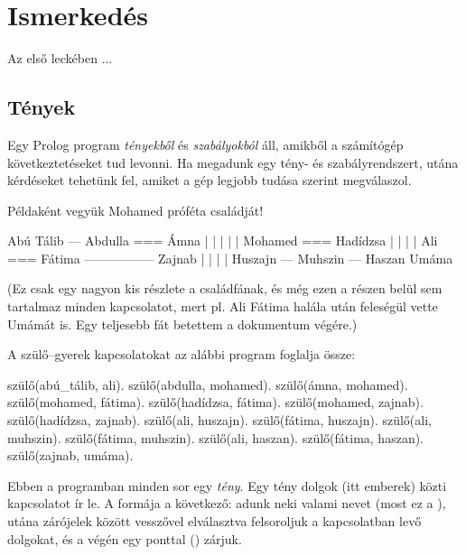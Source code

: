 
\chapter{Ismerkedés}

Az első leckében ...

\section{Tények}

Egy Prolog program \emph{tényekből} és
\emph{szabályokból} áll, amikből a számítógép
következtetéseket tud levonni. Ha megadunk egy
tény- és szabályrendszert, utána kérdéseket
tehetünk fel, amiket a gép legjobb tudása szerint
megválaszol.

Példaként vegyük Mohamed próféta családját!
\begin{prolog}
 Abú Tálib --- Abdulla === Ámna
     |                  |
     |                  |
     |               Mohamed === Hadídzsa
     |                        |
     |                        |
    Ali === Fátima ----------------- Zajnab
         |                             |
         |                             |
Huszajn --- Muhszin --- Haszan       Umáma
\end{prolog}
(Ez csak egy nagyon kis részlete a családfának, és
még ezen a részen belül sem tartalmaz minden
kapcsolatot, mert pl. Ali Fátima halála után
feleségül vette Umámát is. Egy teljesebb fát
betettem a dokumentum végére.)

A szülő--gyerek kapcsolatokat az alábbi program
foglalja össze:

\begin{prolog}
szülő(abú_tálib, ali).
szülő(abdulla, mohamed).
szülő(ámna, mohamed).
szülő(mohamed, fátima).
szülő(hadídzsa, fátima).
szülő(mohamed, zajnab).
szülő(hadídzsa, zajnab).
szülő(ali, huszajn).
szülő(fátima, huszajn).
szülő(ali, muhszin).
szülő(fátima, muhszin).
szülő(ali, haszan).
szülő(fátima, haszan).
szülő(zajnab, umáma).
\end{prolog}

Ebben a programban minden sor egy \emph{tény}. Egy
tény dolgok (itt emberek) közti kapcsolatot ír
le. A formája a következő: adunk neki valami nevet
(most ez a ), utána zárójelek között
vesszővel elválasztva felsoroljuk a kapcsolatban
levő dolgokat, és a végén egy ponttal ()
zárjuk.

